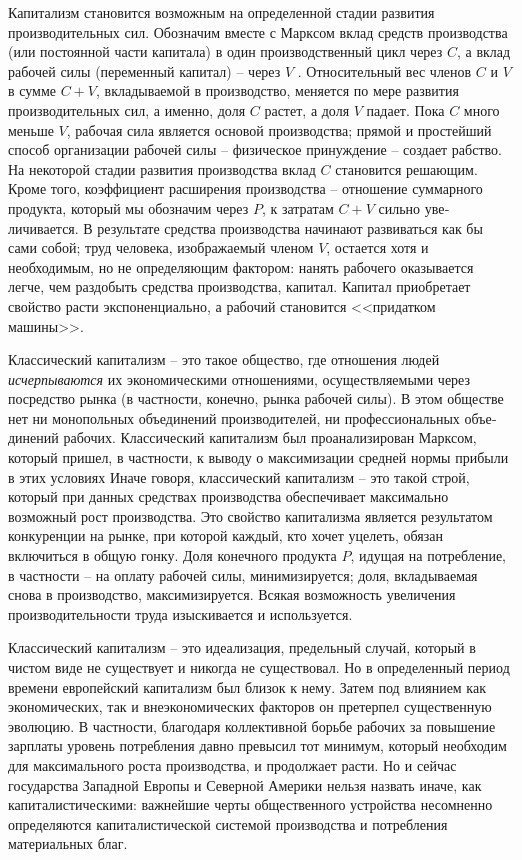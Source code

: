 \documentclass{book}
\begin{document}
Капитализм становится возможным на определенной ста­дии развития производительных сил. Обозначим вместе с Марк­сом вклад средств производства (или постоянной части капи­тала) в один производственный цикл через $C$, а вклад рабочей силы (переменный капитал) -- через $V$ . Относительный вес членов $C$ и $V$ в сумме $C + V$, вкладываемой в производство, меняется по мере развития производительных сил, а именно, доля $C$ растет, а доля $V$ падает. Пока $C$ много меньше $V$, рабо­чая сила является основой производства; прямой и прос\-тей\-ший способ организации рабочей силы -- физическое принуждение -- создает рабство. На некоторой стадии развития производства вклад $C$ становится решающим. Кроме того, коэффициент расширения производства -- отношение суммарного продукта, который мы обозначим через $P$, к затратам $C + V$ сильно уве­личивается. В результате средства производства начинают раз­виваться как бы сами собой; труд человека, изображаемый членом $V$, остается хотя и необходимым, но не определяющим фактором: 
нанять рабочего оказывается легче, чем раздобыть средства производства, капитал. Капитал приобретает свойст­во расти экспоненциально, а рабочий становится <<придатком машины>>.

Классический капитализм -- это такое общество, где отно­шения людей \textit{исчерпываются}  их экономическими отношениями, осуществляемыми через посредство рынка (в частности, конеч­но, рынка рабочей силы). В этом обществе нет ни монополь­ных объединений производителей, ни профессиональных объе­динений рабочих. Классический капитализм был проанализи­рован Марксом, который пришел, в частности, к выводу о мак­симизации средней нормы прибыли в этих условиях Иначе го­воря, классический капитализм -- это такой строй, который при данных средствах производства обеспечивает максималь­но возможный рост производства. Это свойство капитализма является результатом конкуренции на рынке, при которой каж­дый, кто хочет уцелеть, обязан включиться в общую гонку. Доля конечного продукта $P$, идущая на потребление, в част­ности -- на оплату рабочей силы, минимизируется; доля, вкла­дываемая снова в производство, максимизируется. Всякая воз­можность увеличения производительности труда изыскивает­ся и используется.

Классический капитализм -- это идеализация, предельный случай, который в чистом виде не существует и никогда не су­ществовал. Но в определенный период времени европейский капитализм был близок к нему. Затем под влиянием как эко­номических, так и внеэкономических факторов он претерпел существенную эволюцию. В частности, благодаря коллективной борьбе рабочих за повышение зарплаты уровень потребления давно превысил тот минимум, который необходим для макси­мального роста производства, и продолжает расти. Но и сейчас государства Западной Европы и Северной Америки нельзя наз­вать иначе, как капиталистическими: важнейшие черты общест­венного устройства несомненно определяются капиталистиче­ской системой производства и потребления материальных благ.
\end{document}
